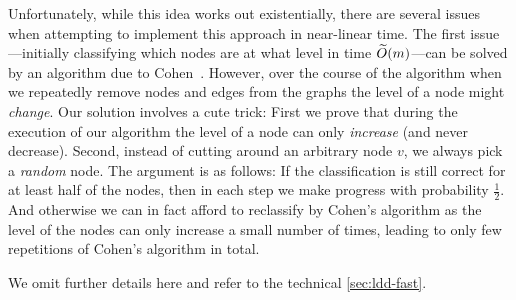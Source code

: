 Unfortunately, while this idea works out existentially, there are several issues when attempting to implement this approach in near-linear time. The first issue---initially classifying which nodes are at what level in time $\widetilde{O}(m)$---can be solved by an algorithm due to Cohen~\cite{Cohen97}. However, over the course of the algorithm when we repeatedly remove nodes and edges from the graphs the level of a node might \emph{change}. Our solution involves a cute trick: First we prove that during the execution of our algorithm the level of a node can only \emph{increase} (and never decrease). Second, instead of cutting around an arbitrary node $v$, we always pick a \emph{random} node. The argument is as follows: If the classification is still correct for at least half of the nodes, then in each step we make progress with probability $\frac12$. And otherwise we can in fact afford to reclassify by Cohen's algorithm as the level of the nodes can only increase a small number of times, leading to only few repetitions of Cohen's algorithm in total.

We omit further details here and refer to the technical \cref{sec:ldd-fast}.